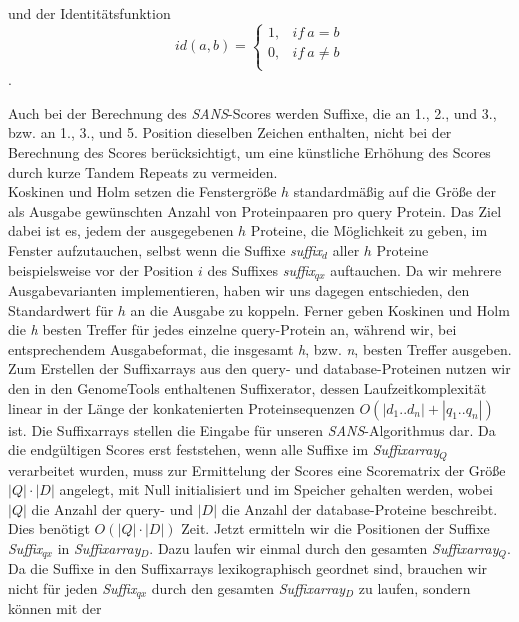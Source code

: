 \documentclass{article}
\begin{document}
und der Identitätsfunktion\\

\begin{equation*}
id(a,b)=\begin{cases}
  1,  & if~a=b\\
  0,  & if~a\ne b\\
\end{cases}
\end{equation*}.

Auch bei der Berechnung des \emph{SANS}-Scores werden Suffixe, die an 1., 2., und 3., bzw. an 1., 3., und 5. Position dieselben Zeichen enthalten, nicht bei der Berechnung des Scores berücksichtigt, um eine künstliche Erhöhung des Scores durch kurze Tandem Repeats zu vermeiden.\\
Koskinen und Holm setzen die Fenstergröße $h$ standardmäßig auf die Größe der als
Ausgabe gewünschten Anzahl von Proteinpaaren pro query Protein. 
Das Ziel dabei ist es, jedem der ausgegebenen $h$ Proteine, die Möglichkeit zu
geben, im Fenster aufzutauchen, selbst wenn die Suffixe \emph{suffix$_{d}$}
aller $h$ Proteine beispielsweise vor der Position $i$ des Suffixes
\emph{suffix$_{qx}$} auftauchen. 
Da wir mehrere Ausgabevarianten implementieren, haben wir uns dagegen entschieden, den Standardwert für $h$ an die Ausgabe zu koppeln. Ferner geben Koskinen und Holm die \textit h besten Treffer für jedes einzelne query-Protein an, während wir, bei entsprechendem Ausgabeformat, die insgesamt \textit h, bzw. \textit n, besten Treffer ausgeben.\\
Zum Erstellen der Suffixarrays aus den query- und database-Proteinen nutzen wir
den in den GenomeTools enthaltenen Suffixerator, dessen Laufzeitkomplexität
linear in der Länge der konkatenierten Proteinsequenzen $O(|d_1..d_n|+|q_1..q_n|)$ ist.
Die Suffixarrays stellen die Eingabe für unseren  \emph{SANS}-Algorithmus dar.
Da die endgültigen Scores erst feststehen, wenn alle Suffixe im
\emph{Suffixarray$_Q$}
verarbeitet wurden, muss zur Ermittelung der Scores eine Scorematrix der Größe
$|Q|\cdot|D|$ angelegt, mit Null initialisiert und im Speicher gehalten werden, wobei $|Q|$ die Anzahl
der query- und $|D|$ die Anzahl der database-Proteine beschreibt. Dies benötigt
$O(|Q|\cdot|D|)$ Zeit. Jetzt ermitteln wir die Positionen der Suffixe
\emph{Suffix$_{qx}$} in \emph{Suffixarray$_D$}. Dazu laufen wir einmal durch
den gesamten \emph{Suffixarray$_Q$}. Da die Suffixe in den Suffixarrays
lexikographisch geordnet sind, brauchen wir nicht für jeden \emph{Suffix$_{qx}$}
durch den gesamten \emph{Suffixarray$_D$} zu laufen, sondern können mit der
\end{document}
